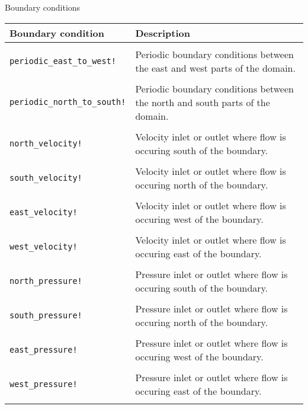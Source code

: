 \documentclass[pdf]{beamer}
\begin{document}
\begin{frame}{Boundary conditions}
\begin{table}
    \tiny
    \centering
    \begin{tabularx}{\textwidth}{l X}
      \textbf{Boundary condition} & \textbf{Description} \\
      \hline \\
      \texttt{periodic\_east\_to\_west!} & Periodic boundary conditions between the east and west parts of the domain. \\
      \\
      \texttt{periodic\_north\_to\_south!} & Periodic boundary conditions between the north and south parts of the domain. \\
      \\
      \texttt{north\_velocity!} & Velocity inlet or outlet where flow is occuring south of the boundary. \\
      \\
      \texttt{south\_velocity!} & Velocity inlet or outlet where flow is occuring north of the boundary. \\
      \\
      \texttt{east\_velocity!} & Velocity inlet or outlet where flow is occuring west of the boundary. \\
      \\
      \texttt{west\_velocity!} & Velocity inlet or outlet where flow is occuring east of the boundary. \\
      \\
      \texttt{north\_pressure!} & Pressure inlet or outlet where flow is occuring south of the boundary. \\
      \\
      \texttt{south\_pressure!} & Pressure inlet or outlet where flow is occuring north of the boundary. \\
      \\
      \texttt{east\_pressure!} & Pressure inlet or outlet where flow is occuring west of the boundary. \\
      \\
      \texttt{west\_pressure!} & Pressure inlet or outlet where flow is occuring east of the boundary. \\
      \\
    \end{tabularx}
  \end{table}
\end{frame}
\end{document}
